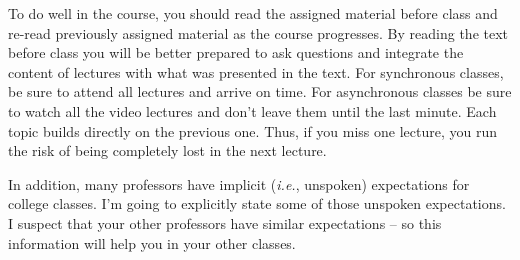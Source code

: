 \documentclass[11pt,]{article}
\begin{document}
To do well in the course, you should read the assigned material before
class and re-read previously assigned material as the course progresses.
By reading the text before class you will be better prepared to ask
questions and integrate the content of lectures with what was presented
in the text. For synchronous classes, be sure to attend all lectures and
arrive on time. For asynchronous classes be sure to watch all the video
lectures and don't leave them until the last minute. Each topic builds
directly on the previous one. Thus, if you miss one lecture, you run the
risk of being completely lost in the next lecture.

In addition, many professors have implicit (\emph{i.e.}, unspoken)
expectations for college classes. I'm going to explicitly state some of
those unspoken expectations. I suspect that your other professors have
similar expectations -- so this information will help you in your other
classes.
\end{document}
